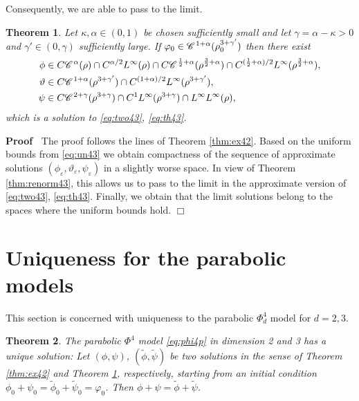\documentclass[a4paper,11pt]{article}
\newenvironment{proof}{\noindent\textbf{Proof\ }}{\hspace*{\fill}$\Box$\medskip}
\newtheorem{theorem}{Theorem}[section]
\numberwithin{equation}{section}
\newcommand{\CC}{\mathscr{C} \hspace{.1em}}
\newcommand{\8}{\infty}
\begin{document}
Consequently, we are able  to pass to the limit.

\begin{theorem}\label{thm:ex3d}
Let $\kappa, \alpha\in (0,1)$ be chosen sufficiently small and let $\gamma=\alpha-\kappa>0$ and $\gamma'\in(0,\gamma)$ sufficiently large. If $\varphi_{0}\in \CC^{1+\alpha}(\rho^{3+\gamma'}_{0})$ then there exist
\begin{align*}
\phi&\in C\CC^{\alpha}(\rho)\cap C^{\alpha/2}L^{\infty}(\rho)\cap C\CC^{\frac 12+\alpha}(\rho^{\frac 32+\alpha})\cap C^{(\frac 12+\alpha)/2}L^{\infty}(\rho^{\frac 32+\alpha}),\\
\vartheta&\in C\CC^{1+\alpha}(\rho^{3+\gamma'}) \cap C^{(1+\alpha)/2}L^{\infty}(\rho^{3+\gamma'}),\\
\psi&\in C\CC^{2+\gamma}(\rho^{3+\gamma})\cap C^{1}L^{\infty}(\rho^{3+\gamma})\cap L^{\infty}L^{\infty}(\rho),
\end{align*}
which is a solution to  \eqref{eq:two43}, \eqref{eq:th43}.
\end{theorem}

\begin{proof}
The proof follows the lines of Theorem \ref{thm:ex42}. Based on the uniform bounds from \eqref{eq:un43} we obtain compactness of the sequence of approximate solutions $(\phi_{\varepsilon},\vartheta_{\varepsilon},\psi_{\varepsilon})$ in a slightly worse space. In view of Theorem \ref{thm:renorm43}, this allows us to pass to the limit in the approximate version of \eqref{eq:two43}, \eqref{eq:th43}. Finally, we obtain that the limit solutions belong to the spaces where the uniform bounds hold.
\end{proof}














\section{Uniqueness for the parabolic models}
\label{s:uniq}


This  section is concerned with uniqueness to the parabolic
$\Phi^4_d$ model for $d = 2, 3$.

\begin{theorem}
  \label{thm:uniq3d}
The parabolic $\Phi^{4}$ model \eqref{eq:phi4p} in dimension 2 and 3 has a unique solution: Let $(\phi,\psi)$, $(\tilde\phi,\tilde\psi)$ be two solutions in the sense of Theorem \ref{thm:ex42} and Theorem \ref{thm:ex3d}, respectively, starting from an initial condition $\phi_{0}+\psi_{0}=\tilde\phi_{0}+\tilde\psi_{0}=\varphi_{0}$. Then $\phi+\psi=\tilde\phi+\tilde\psi$.
\end{theorem}
\end{document}
